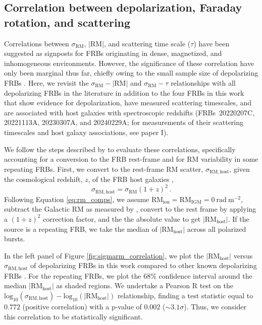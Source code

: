 \documentclass[twocolumn, linenumbers]{aastex701}
\begin{document}
\subsection{Correlation between depolarization, Faraday rotation, and scattering} \label{sec:results_depol}
Correlations between $\sigma_\mathrm{RM}$, $|\mathrm{RM}|$, and scattering time scale ($\tau$) have been suggested as signposts for FRBs originating in dense, magnetized, and inhomogeneous environments. However, the significance of these correlation have only been marginal thus far, chiefly owing to the small sample size of depolarizing FRBs \citep{2022Sci...375.1266F, 2025MNRAS.tmp.1894U, 2026ApJ..1000L..53P}. Here, we revisit the $\sigma_\mathrm{RM}-|\mathrm{RM}|$ and $\sigma_\mathrm{RM}-\tau$ relationships with all depolarizing FRBs in the literature in addition to the four FRBs in this work that show evidence for depolarization, have measured scattering timescales, and are associated with host galaxies with spectroscopic redshifts (FRBs~20220207C, 20221113A, 20230307A, and 20240229A; for measurements of their scattering timescales and host galaxy associations, see paper I).

We follow the steps described by \cite{2026ApJ..1000L..53P} to evaluate these correlations, specifically accounting for a conversion to the FRB rest-frame and for RM variability in some repeating FRBs. First, we convert to the rest-frame RM scatter, $\sigma_\mathrm{RM,host}$, given the cosmological redshift, $z$, of the FRB host galaxies \citep{2024MNRAS.528.2511T},
\begin{equation}
\sigma_\mathrm{RM,host} = \sigma_\mathrm{RM} (1+z)^2\,. \label{eq:sigma_rm_host}
\end{equation}
Following Equation \ref{eq:rm_comps}, we assume $\mathrm{RM}_\mathrm{ion} = \mathrm{RM}_\mathrm{IGM} = 0~\mathrm{rad}~\mathrm{m}^{-2}$, subtract the Galactic RM as measured by \cite{2022A&A...657A..43H}, convert to the rest frame by applying a $(1+z)^2$ correction factor, and the the absolute value to get $|\mathrm{RM}_\mathrm{host}|$. If the source is a repeating FRB, we take the median of $|\mathrm{RM}_\mathrm{host}|$ across all polarized bursts.

In the left panel of Figure \ref{fig:sigmarm_correlation}, we plot the $|\mathrm{RM}_\mathrm{host}|$ versus $\sigma_\mathrm{RM,host}$ of depolarizing FRBs in this work compared to other known depolarizing FRBs \citep{2022Sci...375.1266F, 2025MNRAS.tmp.1894U, 2026ApJ..1000L..53P}. For the repeating FRBs, we plot the 68\% confidence interval around the median $|\mathrm{RM}_\mathrm{host}|$ as shaded regions. We undertake a Pearson R test on the $\mathrm{log}_{10}(\sigma_\mathrm{RM,host})-\mathrm{log}_{10}(|\mathrm{RM}_\mathrm{host}|)$ relationship, finding a test statistic equal to $0.772$ (positive correlation) with a p-value of $0.002$ ($\sim 3.1 \sigma$). Thus, we consider this correlation to be statistically significant.
\end{document}
